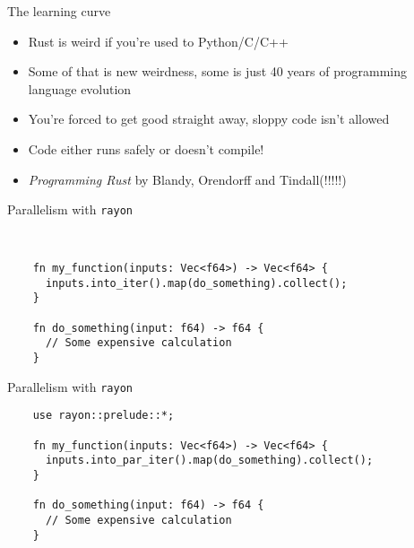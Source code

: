 \documentclass{beamer}
\begin{document}
\begin{frame}{The learning curve}
  \begin{itemize}
    \item Rust is weird if you're used to Python/C/C++
    \item Some of that is new weirdness, some is just 40 years of programming language evolution
    \item You're forced to get good straight away, sloppy code isn't allowed
    \item Code either runs safely or doesn't compile!
    \item \textit{Programming Rust} by Blandy, Orendorff and Tindall(!!!!!)
  \end{itemize}
\end{frame}

\begin{frame}[fragile]{Parallelism with \texttt{rayon}}
  \begin{verbatim}


    fn my_function(inputs: Vec<f64>) -> Vec<f64> {
      inputs.into_iter().map(do_something).collect(); 
    }

    fn do_something(input: f64) -> f64 {
      // Some expensive calculation
    }
  \end{verbatim}
\end{frame}

\begin{frame}[fragile]{Parallelism with \texttt{rayon}}
  \begin{verbatim}
    use rayon::prelude::*;

    fn my_function(inputs: Vec<f64>) -> Vec<f64> {
      inputs.into_par_iter().map(do_something).collect(); 
    }

    fn do_something(input: f64) -> f64 {
      // Some expensive calculation
    }
  \end{verbatim}
\end{frame}
\end{document}
